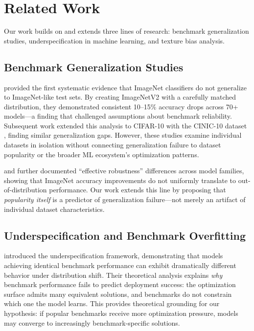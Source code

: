 \section{Related Work}

Our work builds on and extends three lines of research: benchmark generalization studies, underspecification in machine learning, and texture bias analysis.

\subsection{Benchmark Generalization Studies}

\citet{recht2019imagenet} provided the first systematic evidence that ImageNet classifiers do not generalize to ImageNet-like test sets. By creating ImageNetV2 with a carefully matched distribution, they demonstrated consistent 10--15\% accuracy drops across 70+ models---a finding that challenged assumptions about benchmark reliability. Subsequent work extended this analysis to CIFAR-10 with the CINIC-10 dataset \citep{darlow2018cinic}, finding similar generalization gaps. However, these studies examine individual datasets in isolation without connecting generalization failure to dataset popularity or the broader ML ecosystem's optimization patterns.

\citet{engstrom2020identifying} and \citet{taori2020measuring} further documented ``effective robustness'' differences across model families, showing that ImageNet accuracy improvements do not uniformly translate to out-of-distribution performance. Our work extends this line by proposing that \emph{popularity itself} is a predictor of generalization failure---not merely an artifact of individual dataset characteristics.

\subsection{Underspecification and Benchmark Overfitting}

\citet{damour2020underspecification} introduced the underspecification framework, demonstrating that models achieving identical benchmark performance can exhibit dramatically different behavior under distribution shift. Their theoretical analysis explains \emph{why} benchmark performance fails to predict deployment success: the optimization surface admits many equivalent solutions, and benchmarks do not constrain which one the model learns. This provides theoretical grounding for our hypothesis: if popular benchmarks receive more optimization pressure, models may converge to increasingly benchmark-specific solutions.

